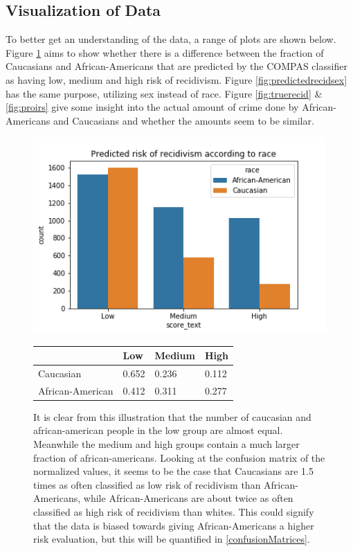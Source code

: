 \documentclass[11pt, fleqn, titlepage]{article}
\begin{document}
	\subsection{Visualization of Data} \label{dataVisuals}
	To better get an understanding of the data, a range of plots are shown below. Figure \ref{fig:predictedrecidrace} aims to show whether there is a difference between the fraction of Caucasians and African-Americans that are predicted by the COMPAS classifier as having low, medium and high risk of recidivism. Figure \ref{fig:predictedrecidsex} has the same purpose, utilizing sex instead of race. Figure \ref{fig:truerecid} \& \ref{fig:proirs} give some insight into the actual amount of crime done by African-Americans and Caucasians and whether the amounts seem to be similar.
	
	\begin{figure}[H]
		\centering
		\includegraphics[width=0.5\linewidth]{imgs/predicted_recid_race}	
		\begin{table}[H]
			\centering
			\begin{tabular}{|l|l|l|l|}
				\hline
				& Low   & Medium & High  \\ \hline
				Caucasian        & 0.652 & 0.236  & 0.112 \\ \hline
				African-American & 0.412 & 0.311  & 0.277 \\ \hline
			\end{tabular}
		\end{table}
		\caption{It is clear from this illustration that the number of caucasian and african-american people in the low group are almost equal. Meanwhile the medium and high groups contain a much larger fraction of african-americans. Looking at the confusion matrix of the normalized values, it seems to be the case that Caucasians are 1.5 times as often classified as low risk of recidivism than African-Americans, while African-Americans are about twice as often classified as high risk of recidivism than whites. This could signify that the data is biased towards giving African-Americans a higher risk evaluation, but this will be quantified in \ref{confusionMatrices}.}
		\label{fig:predictedrecidrace}
	\end{figure}
\end{document}
